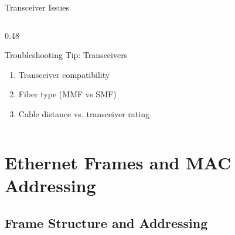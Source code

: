 \documentclass[aspectratio=169]{beamer}  %
\begin{document}
\begin{frame}{Transceiver Issues}
\begin{columns}[T]
\begin{column}{0.48\textwidth}
            \vspace{0.3em}
            \begin{exampleblock}{Troubleshooting Tip: Transceivers}
                \begin{enumerate}
                    \item Transceiver compatibility
                    \item Fiber type (MMF vs SMF)
                    \item Cable distance vs. transceiver rating
                \end{enumerate}
            \end{exampleblock}
        \end{column}
    \end{columns}
\end{frame}

\section{Ethernet Frames and MAC Addressing}
\subsection{Frame Structure and Addressing}

\end{document}
